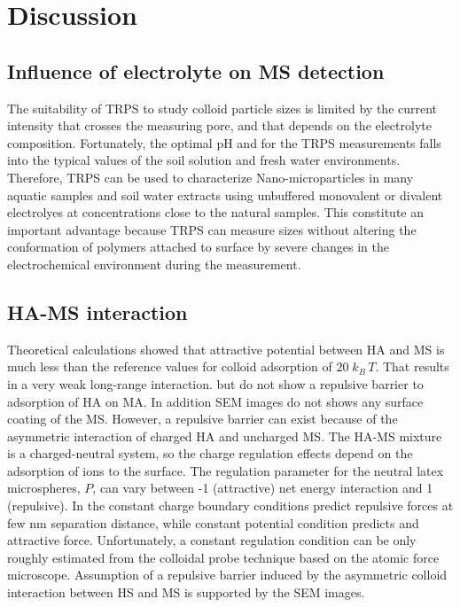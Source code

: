 \documentclass[journal=langd5,manuscript=article]{achemso}
\begin{document}

\section{Discussion}


\subsection{Influence of electrolyte on MS detection}
%
The suitability of TRPS to study colloid particle sizes is limited by the current intensity that crosses the measuring pore, and  that depends on the electrolyte composition. Fortunately, the optimal pH and \ce{[Ca^{2+}]} for the TRPS measurements falls into the typical values of the soil solution\cite{wolt1994soil} and  fresh water environments\cite{Stumm1993}. Therefore, TRPS can be used to characterize Nano-microparticles in many  aquatic samples and soil water extracts using unbuffered monovalent or divalent electrolyes at concentrations close to the natural samples. This constitute an important advantage because TRPS can measure sizes without altering the conformation of polymers attached to surface by severe changes in the electrochemical environment during the measurement.

\subsection{HA-MS interaction}
Theoretical calculations showed that attractive potential between HA and MS 
is much less than the reference values for colloid adsorption  of $20\;k_B\,T$\cite{Adamczyk1999}. That results in a very weak long-range interaction.
but do not show a repulsive barrier to adsorption of HA on MA. In addition 
 SEM images do not shows any surface coating of the MS. 
However, a repulsive barrier can exist because of the asymmetric interaction of charged HA and uncharged MS. 
The HA-MS mixture is a charged-neutral system, so the charge regulation effects depend on the adsorption of ions to the surface.
The regulation parameter for the neutral latex microspheres, $P$, can vary between -1 (attractive) net energy interaction and 1  (repulsive). In the constant charge boundary conditions predict  repulsive forces at few nm separation distance, while constant potential condition predicts and attractive force\cite{Trefalt2014}.
Unfortunately, a constant regulation condition can be only roughly estimated from the  colloidal probe technique based on the atomic force microscope\cite{Ruiz-Cabello2013}.
Assumption of a repulsive barrier induced by the asymmetric colloid interaction between HS and MS is supported by the SEM images.
\end{document}
